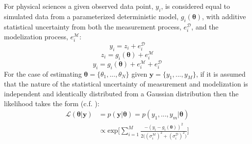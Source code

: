 For physical sciences a given observed data point, $y_i$, is considered equal to simulated data from a parameterized deterministic model, $g_i(\bm{\theta})$, with additive statistical uncertainty from both the measurement process, $e^{\mathcal{D}}_i$, and the modelization process, $e^{\mathcal{M}}_i$:
\begin{equation}
y_i = z_i + e^{\mathcal{D}}_i
\end{equation}
\begin{equation}
z_i = g_i(\bm{\theta}) + e^{\mathcal{M}}_i
\end{equation}
\begin{equation}
y_i = g_i(\bm{\theta}) + e^{\mathcal{M}}_i + e^{\mathcal{D}}_i
\end{equation}
For the case of estimating $\bm{\theta} = \{\theta_1,...,\theta_N\}$ given $\bm{y} = \{y_1,...,y_M\}$, if it is assumed that the nature of the statistical uncertainty of measurement and modelization is independent and identically distributed from a Gaussian distribution then the likelihood takes the form (c.f. \citet[p.91-92]{gregory2005bayesian}): 
\begin{equation}
\begin{split}
\mathcal{L}(\bm{\theta}|\bm{y}) &= p(\bm{y}|\bm{\theta}) = p(y_1,...,y_m|\bm{\theta})\\
&\propto  \text{exp}\bigg[\sum_{i = 1}^{M}\frac{-(y_i-g_i({\bm{\theta}}))^2}{2\big((\sigma^{\mathcal{M}}_i)^2+(\sigma^{\mathcal{D}}_i)^2\big)}\bigg]
\end{split}
\label{likelihood-1}
\end{equation}

